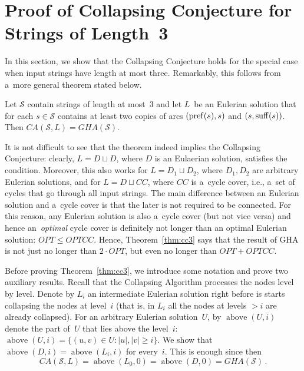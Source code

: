 \section{Proof of Collapsing Conjecture for Strings of Length~3}
\label{subsec:scs3}
In this section, we show that the Collapsing Conjecture holds for 
the special case
when input strings have length at most three. 
Remarkably, this follows from a~more general theorem stated below.

\begin{theorem}\label{thm:cc3}
Let $\mathcal{S}$ contain strings of length at most~3 and let $L$~be an Eulerian solution that for each $s \in \mathcal{S}$ contains at least two copies of arcs $(\operatorname{pref}(s), s)$ and $(s, \operatorname{suff}(s))$. Then $CA(\mathcal{S}, L)=GHA(\mathcal{S})$.
\end{theorem}

It is not difficult to see that the theorem indeed implies the Collapsing Conjecture: clearly, $L=D \sqcup D$, where $D$ is an Eulaerian solution, satisfies the condition. Moreover, this also works for $L=D_1 \sqcup D_2$, where $D_1, D_2$ are arbitrary Eulerian solutions, and for $L=D \sqcup CC$, where $CC$ is a~cycle cover, i.e., a~set of cycles that go through all input strings. The main difference between an Eulerian solution and a~cycle cover is that the later is not required to be connected. For this reason, any Eulerian solution is also a~cycle cover (but not vice versa) and hence an~{\em optimal} cycle cover is definitely not longer than an optimal Eulerian solution: $OPT \le OPTCC$. Hence, Theorem~\ref{thm:cc3} says that the result of GHA is not just no longer than $2\cdot OPT$, but even no longer than $OPT+OPTCC$.

Before proving Theorem~\ref{thm:cc3}, we introduce some notation and 
prove two auxiliary results. Recall that the Collapsing Algorithm processes the nodes level by level. Denote by $L_i$ an intermediate Eulerian solution right before is starts collapsing the nodes at level~$i$ (that is, in $L_i$ all the nodes at levels $>i$ are already collapsed). 
For an arbitrary Eulerian solution~$U$, by $\operatorname{above}(U,i)$ denote the part of~$U$ that lies above the level~$i$: 
$\operatorname{above}(U,i)=\{(u, v) \in U \colon |u|, |v| \ge i\}$.
We show that $\operatorname{above}(D,i)=\operatorname{above}(L_i, i)$ for every~$i$. This is enough since then \[CA(\mathcal{S}, L)=\operatorname{above}(L_0,0)=\operatorname{above}(D,0)=GHA(\mathcal{S}) \, .\]


